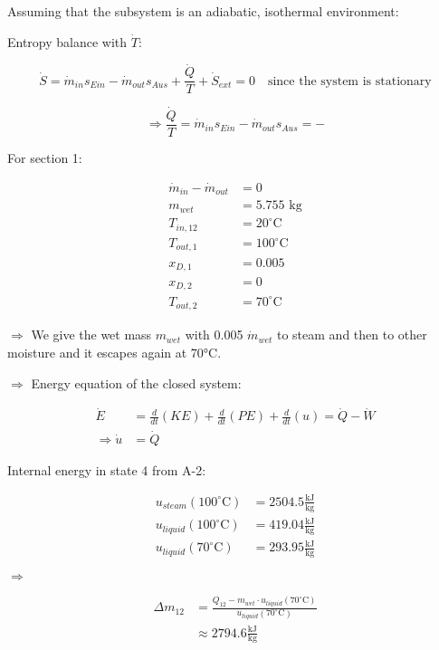 Assuming that the subsystem is an adiabatic, isothermal environment:

Entropy balance with \(\dot{T}\):

\[
\dot{S} = \dot{m}_{in} s_{Ein} - \dot{m}_{out} s_{Aus} + \frac{\dot{Q}}{T} + \dot{S}_{ext} = 0 \quad \text{since the system is stationary}
\]

\[
\Rightarrow \frac{\dot{Q}}{T} = \dot{m}_{in} s_{Ein} - \dot{m}_{out} s_{Aus} = -\]

For section 1:

\begin{align*}
    \dot{m}_{in} - \dot{m}_{out} &= 0 \\
    m_{wet} &= 5.755 \text{ kg} \\
    T_{in,12} &= 20^\circ \text{C} \\
    T_{out,1} &= 100^\circ \text{C} \\
    x_{D,1} &= 0.005 \\
    x_{D,2} &= 0 \\
    T_{out,2} &= 70^\circ \text{C}
\end{align*}

\(\Rightarrow\) We give the wet mass \(m_{wet}\) with 0.005 \(\dot{m}_{wet}\) to steam and then to other moisture and it escapes again at 70°C.

\(\Rightarrow\) Energy equation of the closed system:

\begin{align*}
    \dot{E} &= \frac{d}{dt} (KE) + \frac{d}{dt} (PE) + \frac{d}{dt} (u) = \dot{Q} - \dot{W} \\
    \Rightarrow \dot{u} &= \dot{Q}
\end{align*}

Internal energy in state 4 from A-2:

\begin{align*}
    u_{steam}(100^\circ \text{C}) &= 2504.5 \frac{\text{kJ}}{\text{kg}} \\
    u_{liquid}(100^\circ \text{C}) &= 419.04 \frac{\text{kJ}}{\text{kg}} \\
    u_{liquid}(70^\circ \text{C}) &= 293.95 \frac{\text{kJ}}{\text{kg}}
\end{align*}

\(\Rightarrow\)

\begin{align*}
    \Delta m_{12} &= \frac{Q_{12} - m_{wet} \cdot u_{liquid}(70^\circ \text{C})}{u_{liquid}(70^\circ \text{C})} \\
    &\approx 2794.6 \frac{\text{kJ}}{\text{kg}}
\end{align*}